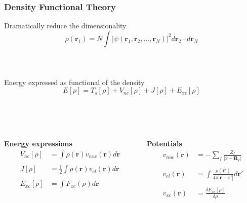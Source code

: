 \documentclass[mathserif, 10pt]{beamer}
\begin{document}
\begin{frame}
    \frametitle{Density Functional Theory}
    \centering
    Dramatically reduce the dimensionality
    \begin{equation}
	\nonumber
	\rho(\boldsymbol{r}_1) = N \int |\psi(\boldsymbol{r}_1, \boldsymbol{r}_2,\dots,
	\boldsymbol{r}_N)|^2 d\boldsymbol{r}_2\cdots d\boldsymbol{r}_N
    \end{equation}
    \ \\
    \ \\
    \ \\
    \pause
    Energy expressed as functional of the density
    \begin{equation}
	\nonumber
	E[\rho] = T_s[\rho] + V_{ne}[\rho] + J[\rho] + E_{xc}[\rho]
    \end{equation}
    \ \\
    \ \\
    \ \\
    \begin{columns}
    \begin{column}{.50\textwidth}
    \centering
    \pause
    \textbf{Energy expressions}
    \begin{align}
	\nonumber
	V_{ne}[\rho]	&= \int \rho(\boldsymbol{r})v_{nuc}(\boldsymbol{r})d\boldsymbol{r}\\
	\nonumber
			&\\
	\nonumber
	J[\rho] &= \frac{1}{2} \int \rho(\boldsymbol{r})v_{el}(\boldsymbol{r})d\boldsymbol{r}\\
	\nonumber
			&\\
	\nonumber
	E_{xc}[\rho]	&= \int F_{xc}(\rho) d\boldsymbol{r}
    \end{align}
    \end{column}
    \begin{column}{.50\textwidth}
    \centering
    \pause
    \textbf{Potentials}
    \begin{align}
	\nonumber
	v_{nuc}(\boldsymbol{r}) &= -\sum_I\frac{Z_I}{|\boldsymbol{r}-\boldsymbol{R}_I|}\\
	\nonumber
			&\\
	\nonumber
	v_{el}(\boldsymbol{r}) &= 
	    \int \frac{\rho(\boldsymbol{r}')}{4\pi|\boldsymbol{r}-\boldsymbol{r}'|} d\boldsymbol{r}'\\
	\nonumber
			&\\
	\nonumber
	v_{xc}(\boldsymbol{r}) &= \frac{\delta E_{xc}[\rho]}{\delta\rho}
    \end{align}
    \end{column}
    \end{columns}    
\end{frame}
\end{document}
